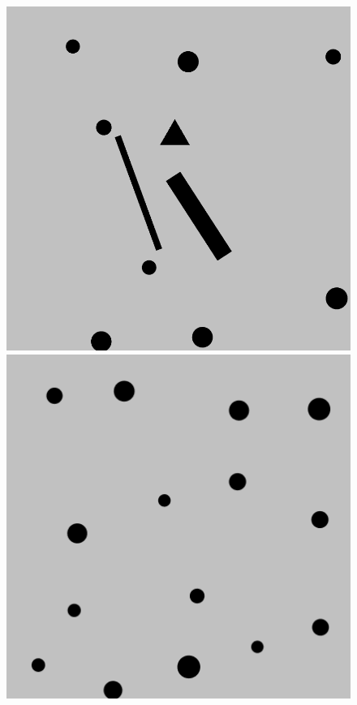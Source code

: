 \documentclass{beamer}
\begin{document}
\begin{frame}
\begin{figure}[H]
\begin{columns}
\begin{column}{0.14\textwidth}
							\includegraphics[width=1\linewidth]{graphics/test_model_11_4.png}
							\includegraphics[width=1\linewidth]{graphics/test_model_15_4.png}
						\end{column}

\end{columns}
\end{figure}
\end{frame}
\end{document}
